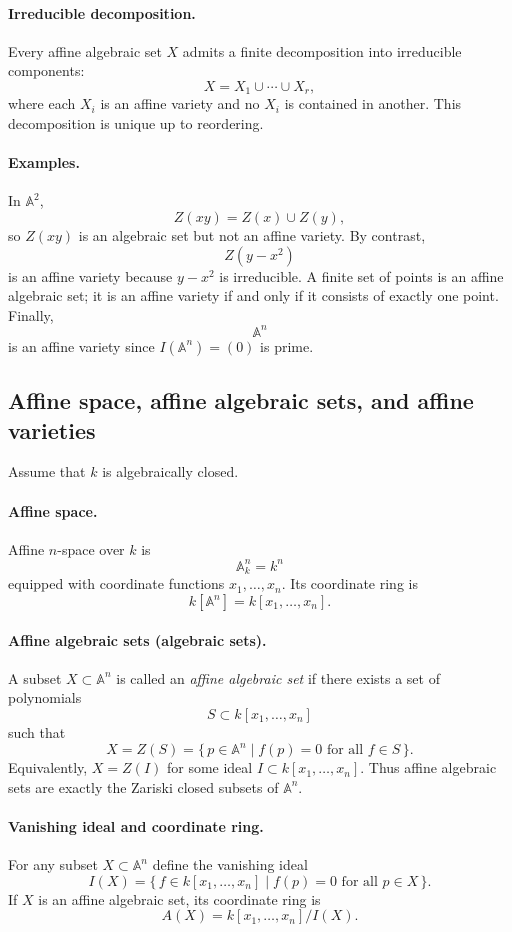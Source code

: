 \documentclass[12pt,a4paper]{article}
\theoremstyle{plain}
\theoremstyle{definition}      %
\begin{document}
\paragraph{Irreducible decomposition.}
Every affine algebraic set $X$ admits a finite decomposition into irreducible components:
\[
X
=
X_1\cup\cdots\cup X_r,
\]
where each $X_i$ is an affine variety and no $X_i$ is contained in another.
This decomposition is unique up to reordering.

\paragraph{Examples.}
In $\mathbb A^2$,
\[
Z(xy)
=
Z(x)\cup Z(y),
\]
so $Z(xy)$ is an algebraic set but not an affine variety.
By contrast,
\[
Z(y-x^2)
\]
is an affine variety because $y-x^2$ is irreducible.
A finite set of points is an affine algebraic set; it is an affine variety if and only if it consists of exactly one point.
Finally,
\[
\mathbb A^n
\]
is an affine variety since $I(\mathbb A^n)=(0)$ is prime.


\subsection*{Affine space, affine algebraic sets, and affine varieties}

Assume that $k$ is algebraically closed.

\paragraph{Affine space.}
Affine $n$-space over $k$ is
\[
\mathbb A^n_k
=
k^n
\]
equipped with coordinate functions $x_1,\dots,x_n$.
Its coordinate ring is
\[
k[\mathbb A^n]
=
k[x_1,\dots,x_n].
\]

\paragraph{Affine algebraic sets (algebraic sets).}
A subset $X\subset \mathbb A^n$ is called an \emph{affine algebraic set} if there exists a set of polynomials
\[
S\subset k[x_1,\dots,x_n]
\]
such that
\[
X
=
Z(S)
=
\{\,p\in \mathbb A^n \mid f(p)=0 \text{ for all } f\in S\,\}.
\]
Equivalently, $X=Z(I)$ for some ideal $I\subset k[x_1,\dots,x_n]$.
Thus affine algebraic sets are exactly the Zariski closed subsets of $\mathbb A^n$.

\paragraph{Vanishing ideal and coordinate ring.}
For any subset $X\subset \mathbb A^n$ define the vanishing ideal
\[
I(X)
=
\{\,f\in k[x_1,\dots,x_n]\mid f(p)=0 \text{ for all } p\in X\,\}.
\]
If $X$ is an affine algebraic set, its coordinate ring is
\[
A(X)
=
k[x_1,\dots,x_n]/I(X).
\]
\end{document}
